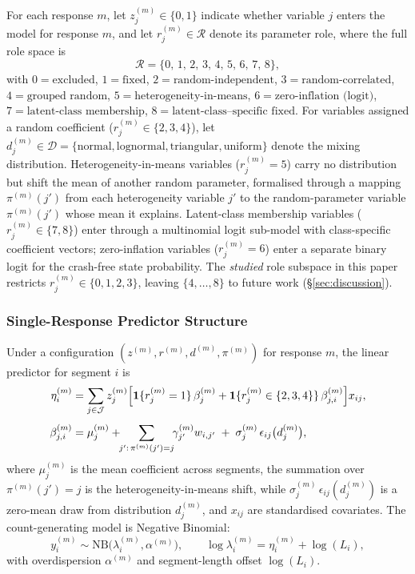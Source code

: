 \documentclass[letterpaper,8pt]{extarticle}  %
\begin{document}
\begin{doublespacing}
\begin{linenumbers}
For each response $m$, let $z_j^{(m)} \in \{0,1\}$ indicate whether variable $j$ enters the model for response $m$, and let $r_j^{(m)} \in \mathcal{R}$ denote its parameter role, where the full role space is
\begin{equation}
  \mathcal{R} = \{0,\,1,\,2,\,3,\,4,\,5,\,6,\,7,\,8\},
\end{equation}
with $0=\text{excluded}$, $1=\text{fixed}$, $2=\text{random-independent}$, $3=\text{random-correlated}$, $4=\text{grouped random}$, $5=\text{heterogeneity-in-means}$, $6=\text{zero-inflation (logit)}$, $7=\text{latent-class membership}$, $8=\text{latent-class--specific fixed}$. For variables assigned a random coefficient ($r_j^{(m)} \in \{2,3,4\}$), let $d_j^{(m)} \in \mathcal{D} = \{\text{normal}, \text{lognormal}, \text{triangular}, \text{uniform}\}$ denote the mixing distribution. Heterogeneity-in-means variables ($r_j^{(m)} = 5$) carry no distribution but shift the mean of another random parameter, formalised through a mapping $\pi^{(m)}(j')$ from each heterogeneity variable $j'$ to the random-parameter variable $\pi^{(m)}(j')$ whose mean it explains. Latent-class membership variables ($r_j^{(m)} \in \{7,8\}$) enter through a multinomial logit sub-model with class-specific coefficient vectors; zero-inflation variables ($r_j^{(m)} = 6$) enter a separate binary logit for the crash-free state probability. The {\em studied} role subspace in this paper restricts $r_j^{(m)} \in \{0,1,2,3\}$, leaving $\{4,\dots,8\}$ to future work (\S\ref{sec:discussion}).

\subsubsection*{Single-Response Predictor Structure}

Under a configuration $(z^{(m)}, r^{(m)}, d^{(m)}, \pi^{(m)})$ for response $m$, the linear predictor for segment $i$ is
\begin{align}
  \eta_{i}^{(m)} &= \sum_{j \in \mathcal{J}} z_j^{(m)} \Bigl[
    \mathbf{1}\{r_j^{(m)} = 1\}\,\beta_j^{(m)}
    + \mathbf{1}\{r_j^{(m)} \in \{2,3,4\}\}\,\beta_{j,i}^{(m)}
  \Bigr] x_{ij}, \label{eq:mathprogram-eta-v2}\\[4pt]
  \beta_{j,i}^{(m)} &= \mu_{j}^{(m)} + \!\!\sum_{j':\,\pi^{(m)}(j')=j}\!\! \gamma_{j'}^{(m)} w_{i,j'} \;+\; \sigma_{j}^{(m)}\,\epsilon_{ij}\bigl(d_j^{(m)}\bigr), \label{eq:mathprogram-beta-v2}
\end{align}
where $\mu_{j}^{(m)}$ is the mean coefficient across segments, the summation over $\pi^{(m)}(j')=j$ is the heterogeneity-in-means shift, while $\sigma_{j}^{(m)}\,\epsilon_{ij}(d_j^{(m)})$ is a zero-mean draw from distribution $d_j^{(m)}$, and $x_{ij}$ are standardised covariates. The count-generating model is Negative Binomial:
\begin{equation}
  y_i^{(m)} \sim \text{NB}\bigl(\lambda_i^{(m)}, \alpha^{(m)}\bigr),\qquad
  \log\lambda_i^{(m)} = \eta_i^{(m)} + \log(L_i),
\end{equation}
with overdispersion $\alpha^{(m)}$ and segment-length offset $\log(L_i)$.


\end{linenumbers}
\end{doublespacing}
\end{document}
